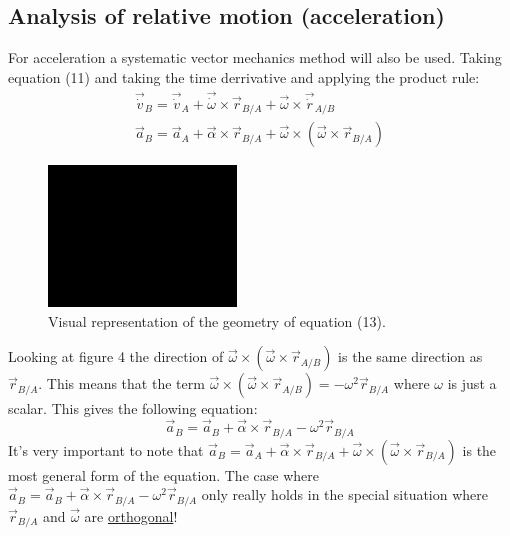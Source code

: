 \documentclass[11pt, a4paper]{article}
\begin{document}
\subsection{Analysis of relative motion (acceleration)}
For acceleration a systematic vector mechanics method will also be used. Taking equation (11) and taking the time derrivative and applying the product rule:
\begin{gather}
  \vec{\dot{v}}_B = \vec{\dot{v}}_A + \vec{\dot{\omega}} \times \vec{r}_{B/A} + \vec{\omega} \times \vec{\dot{r}}_{A/B}\\
  \vec{a}_B = \vec{a}_A + \vec{\alpha} \times \vec{r}_{B/A} + \vec{\omega} \times (\vec{\omega} \times \vec{r}_{B/A})
\end{gather}
\begin{figure}[h]
  \centerline{\includegraphics[width=50mm]{images/placeholder.png}}
  \caption{Visual representation of the geometry of equation (13).}
\end{figure}
Looking at figure 4 the direction of $\vec{\omega} \times (\vec{\omega} \times \vec{r}_{A/B})$ is the same direction as $\vec{r}_{B/A}$. This means that the term $\vec{\omega} \times (\vec{\omega} \times \vec{r}_{A/B}) = -\omega^2\vec{r}_{B/A}$ where $\omega$ is just a scalar. This gives the following equation:
\begin{equation}
  \vec{a}_B = \vec{a}_B + \vec{\alpha} \times \vec{r}_{B/A} - \omega^2\vec{r}_{B/A}
\end{equation}
It's very important to note that $\vec{a}_B = \vec{a}_A + \vec{\alpha} \times \vec{r}_{B/A} + \vec{\omega} \times (\vec{\omega} \times \vec{r}_{B/A})$ is the most general form of the equation. The case where $\vec{a}_B = \vec{a}_B + \vec{\alpha} \times \vec{r}_{B/A} - \omega^2\vec{r}_{B/A}$ only really holds in the special situation where $\vec{r}_{B/A}$ and $\vec{\omega}$ are \underline{orthogonal}!
\end{document}
